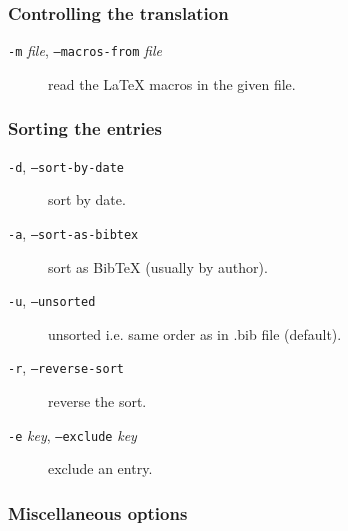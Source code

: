 \documentclass[11pt,a4paper]{article}
\begin{document}
\subsubsection{Controlling the translation}

\begin{description}
  
\item[\texttt{-m} \textit{file}, \texttt{--macros-from} \textit{file}]
  read the LaTeX macros in the given file.


\end{description}


\subsubsection{Sorting the entries}

\begin{description}
  
\item[\texttt{-d}, \texttt{--sort-by-date}] sort by date.

  
\item[\texttt{-a}, \texttt{--sort-as-bibtex}] sort as BibTeX (usually
  by author).

  
\item[\texttt{-u}, \texttt{--unsorted}] unsorted i.e. same order as in
  .bib file (default).

  
\item[\texttt{-r}, \texttt{--reverse-sort}] reverse the sort.

  
\item[\texttt{-e} \textit{key}, \texttt{--exclude} \textit{key}]
  exclude an entry.


\end{description}


\subsubsection{Miscellaneous options}
\end{document}
